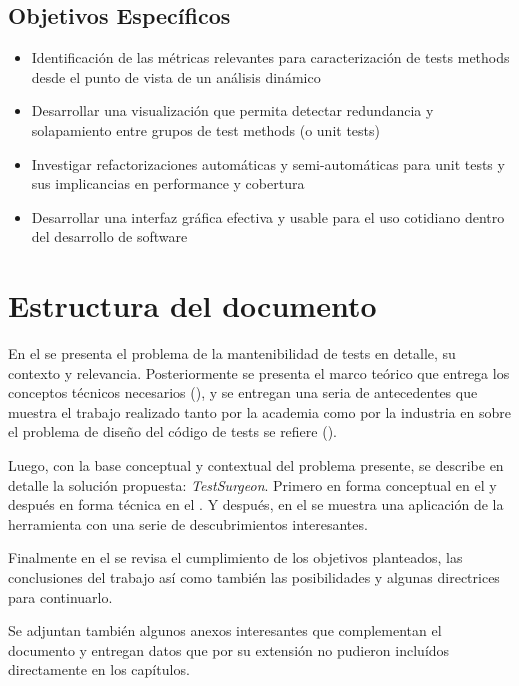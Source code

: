 \subsection*{Objetivos Específicos}
\begin{itemize}
\item Identificación de las métricas relevantes para caracterización de tests methods desde el punto de vista de un análisis dinámico
\item Desarrollar una visualización que permita detectar redundancia y solapamiento entre grupos de test methods (o unit tests)
\item Investigar refactorizaciones automáticas y semi-automáticas para unit tests y sus implicancias en performance y cobertura
\item Desarrollar una interfaz gráfica efectiva y usable para el uso cotidiano dentro del desarrollo de software
\end{itemize}

\section{Estructura del documento}

\par En el  se presenta el problema de la mantenibilidad de tests en detalle, su contexto y relevancia. Posteriormente se presenta el marco teórico que entrega los conceptos técnicos necesarios (), y se entregan una seria de antecedentes que muestra el trabajo realizado tanto por la academia como por la industria en sobre el problema de diseño del código de tests se refiere (). 

\par Luego, con la base conceptual y contextual del problema presente, se describe en detalle la solución propuesta: \emph{TestSurgeon}. Primero en forma conceptual en el  y después en forma técnica en el . Y después, en el  se muestra una aplicación de la herramienta con una serie de descubrimientos interesantes. 

\par Finalmente en el  se revisa el cumplimiento de los objetivos planteados, las conclusiones del trabajo así como también las posibilidades y algunas directrices para continuarlo.

\par Se adjuntan también algunos anexos interesantes que complementan el documento y entregan datos que por su extensión no pudieron incluídos directamente en los capítulos.
